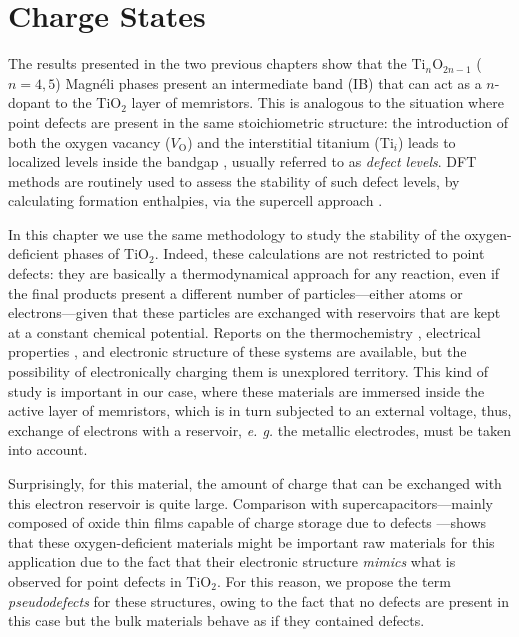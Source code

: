 \chapter{Charge States}
\label{chap:charges}

The results presented in the two previous chapters show that the Ti$_n$O$_{2n-1}$ ($n = 4, 5$) Magnéli phases present an intermediate band (IB) that can act as a $n$-dopant to the TiO$_2$ layer of memristors. This is analogous to the situation where point defects are present in the same stoichiometric structure: the introduction of both the oxygen vacancy ($V_{\text{O}}$) and the interstitial titanium (Ti$_i$) leads to localized levels inside the bandgap \cite{Janotti2010,Lee2012}, usually referred to as \textit{defect levels}. DFT methods are routinely used to assess the stability of such defect levels, by calculating formation enthalpies, via the supercell approach \cite{Haldane1976,Zhang2000,Lany2007}.

In this chapter we use the same methodology to study the stability of the oxygen-deficient phases of TiO$_2$. Indeed, these calculations are not restricted to point defects: they are basically a thermodynamical approach for any reaction, even if the final products present a different number of particles---either atoms or electrons---given that these particles are exchanged with reservoirs that are kept at a constant chemical potential. Reports on the thermochemistry \cite{Liborio2008,Harada2010}, electrical properties \cite{Bartholomew1969}, and electronic structure \cite{Liborio2009,Weissmann2011,Leonov2006} of these systems are available, but the possibility of electronically charging them is unexplored territory. This kind of study is important in our case, where these materials are immersed inside the active layer of memristors, which is in turn subjected to an external voltage, thus, exchange of electrons with a reservoir, \textit{e. g.} the metallic electrodes, must be taken into account.

Surprisingly, for this material, the amount of charge that can be exchanged with this electron reservoir is quite large. Comparison with supercapacitors---mainly composed of oxide thin films capable of charge storage due to defects \cite{Young2015,Simon2008}---shows that these oxygen-deficient materials might be important raw materials for this application due to the fact that their electronic structure \textit{mimics} what is observed for point defects in TiO$_2$. For this reason, we propose the term \textit{pseudodefects} for these structures, owing to the fact that no defects are present in this case but the bulk materials behave as if they contained defects.

